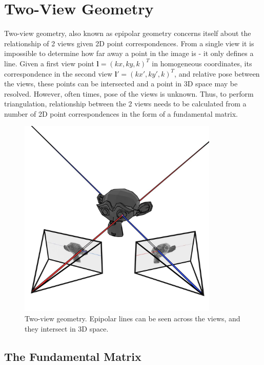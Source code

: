 \documentclass[11pt,english]{report}
\begin{document}
\section{Two-View Geometry}

Two-view geometry, also known as epipolar geometry concerns itself about the relationship of 2 views given 2D point correspondences. From a single view it is impossible to determine how far away a point in the image is - it only defines a line. Given a first view point $\mathbf{l} = (kx, ky, k)^T$ in homogeneous coordinates, its correspondence in the second view $\mathbf{l}' = (kx', ky', k)^T$, and relative pose between the views, these points can be intersected and a point in 3D space may be resolved. However, often times, pose of the views is unknown. Thus, to perform triangulation, relationship between the 2 views needs to be calculated from a number of 2D point correspondences in the form of a fundamental matrix.

\begin{figure}[!ht]
	\centering
	\includegraphics[width=270pt]{docs/report/epipolar-geometry.jpg}
	\caption{\centering Two-view geometry. Epipolar lines can be seen across the views, and they intersect in 3D space.}
\end{figure}

\subsection{The Fundamental Matrix}
\end{document}
